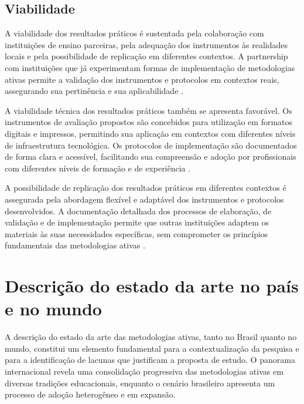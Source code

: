 \subsection{Viabilidade}
\label{subsec:jpr_viabilidade}

A viabilidade dos resultados práticos é sustentada pela colaboração com instituições de ensino parceiras, pela adequação dos instrumentos às realidades locais e pela possibilidade de replicação em diferentes contextos. A partnership com instituições que já experimentam formas de implementação de metodologias ativas permite a validação dos instrumentos e protocolos em contextos reais, assegurando sua pertinência e sua aplicabilidade \cite{MACIEL2018}.

A viabilidade técnica dos resultados práticos também se apresenta favorável. Os instrumentos de avaliação propostos são concebidos para utilização em formatos digitais e impressos, permitindo sua aplicação em contextos com diferentes níveis de infraestrutura tecnológica. Os protocolos de implementação são documentados de forma clara e acessível, facilitando sua compreensão e adoção por profissionais com diferentes níveis de formação e de experiência \cite{RIOS2026}.

A possibilidade de replicação dos resultados práticos em diferentes contextos é assegurada pela abordagem flexível e adaptável dos instrumentos e protocolos desenvolvidos. A documentação detalhada dos processos de elaboração, de validação e de implementação permite que outras instituições adaptem os materiais às suas necessidades específicas, sem comprometer os princípios fundamentais das metodologias ativas \cite{FREITAS2024}.

\section{Descrição do estado da arte no país e no mundo}
\label{sec:estado_arte}

A descrição do estado da arte das metodologias ativas, tanto no Brasil quanto no mundo, constitui um elemento fundamental para a contextualização da pesquisa e para a identificação de lacunas que justificam a proposta de estudo. O panorama internacional revela uma consolidação progressiva das metodologias ativas em diversas tradições educacionais, enquanto o cenário brasileiro apresenta um processo de adoção heterogêneo e em expansão.

